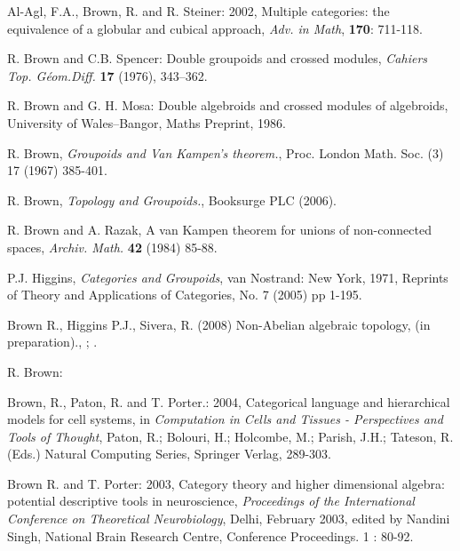 \documentclass[12pt]{article}
\theoremstyle{plain}
\theoremstyle{definition}
\numberwithin{equation}{section}
\newcommand{\<}{{\langle}}
\begin{document}
\begin{thebibliography}{99}

Al-Agl, F.A., Brown, R. and R. Steiner: 2002, Multiple categories: the equivalence of a globular and cubical approach, \emph{Adv. in Math}, \textbf{170}: 711-118.

R. Brown  and C.B. Spencer: Double groupoids and crossed modules, 
\emph{Cahiers Top. G\'eom.Diff.} \textbf{17} (1976), 343--362.

R. Brown and G. H. Mosa: Double algebroids and crossed modules of algebroids, University of Wales--Bangor, Maths Preprint, 1986.

R. Brown, {\em Groupoids and Van Kampen's theorem.}, Proc. London Math. Soc. (3) 17 (1967) 385-401. 

R. Brown, {\em Topology and Groupoids.}, Booksurge PLC (2006).
 
R. Brown and A. Razak, A van Kampen theorem for unions of non-connected spaces, {\em Archiv. Math.} \textbf{42} (1984) 85-88. 

P.J. Higgins, {\em Categories and Groupoids}, van Nostrand: New York, 1971, Reprints of Theory and Applications of Categories, No. 7 (2005) pp 1-195.

Brown R., Higgins P.J., Sivera, R. (2008) Non-Abelian algebraic topology, (in preparation).,
;
.

R. Brown:  

Brown, R., Paton, R. and T. Porter.: 2004, Categorical language and
hierarchical models for cell systems, in \emph{Computation in
Cells and Tissues - Perspectives and Tools of Thought}, Paton, R.;
Bolouri, H.; Holcombe, M.; Parish, J.H.; Tateson, R. (Eds.)
Natural Computing Series, Springer Verlag, 289-303.

Brown R. and T. Porter: 2003, Category theory and higher dimensional algebra: potential descriptive tools in neuroscience, {\em Proceedings of the International Conference on Theoretical Neurobiology}, Delhi, February 2003, edited by Nandini Singh, National Brain Research Centre, Conference Proceedings. {1} : 80-92.



\end{thebibliography}
\end{document}

